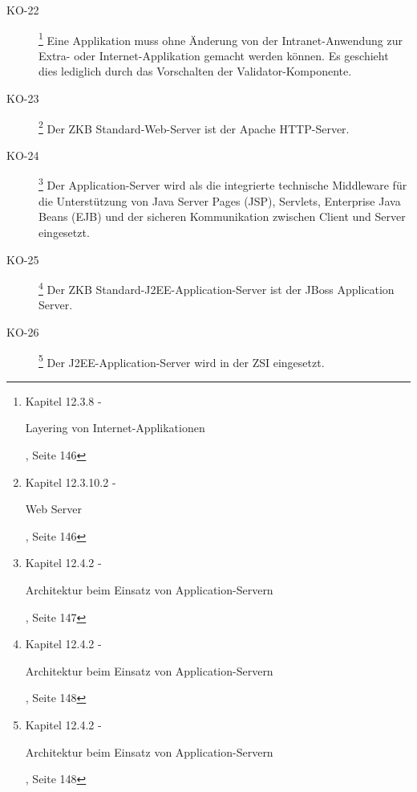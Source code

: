 \begin{description}
    \item[KO-22\label{itm:KO-22}]
    \footnote{\cite{ZkbHandbuchDerItArchitektur} Kapitel 12.3.8 -
    \begin{itshape}Layering von Internet-Applikationen\end{itshape}, Seite 146}
    Eine Applikation muss ohne Änderung von der Intranet-Anwendung zur Extra-
    oder Internet-Applikation gemacht werden können. Es geschieht dies
    lediglich durch das Vorschalten der Validator-Komponente.
    
    \item[KO-23\label{itm:KO-23}]
    \footnote{\cite{ZkbHandbuchDerItArchitektur} Kapitel 12.3.10.2 -
    \begin{itshape}Web Server\end{itshape}, Seite 146}
    Der ZKB Standard-Web-Server ist der Apache HTTP-Server.
    
    \item[KO-24\label{itm:KO-24}]
    \footnote{\cite{ZkbHandbuchDerItArchitektur} Kapitel 12.4.2 -
    \begin{itshape}Architektur beim Einsatz von
    Application-Servern\end{itshape}, Seite 147}
    Der Application-Server wird als die integrierte technische Middleware für
    die Unterstützung von Java Server Pages (JSP), Servlets, Enterprise Java
    Beans (EJB) und der sicheren Kommunikation zwischen Client und Server
    eingesetzt.
    
    \item[KO-25\label{itm:KO-25}]
    \footnote{\cite{ZkbHandbuchDerItArchitektur} Kapitel 12.4.2 -
    \begin{itshape}Architektur beim Einsatz von
    Application-Servern\end{itshape}, Seite 148}
    Der ZKB Standard-J2EE-Application-Server ist der JBoss Application Server.
    
    \item[KO-26\label{itm:KO-26}]
    \footnote{\cite{ZkbHandbuchDerItArchitektur} Kapitel 12.4.2 -
    \begin{itshape}Architektur beim Einsatz von
    Application-Servern\end{itshape}, Seite 148}
    Der J2EE-Application-Server wird in der \ac{ZSI} eingesetzt.
    

\end{description}
